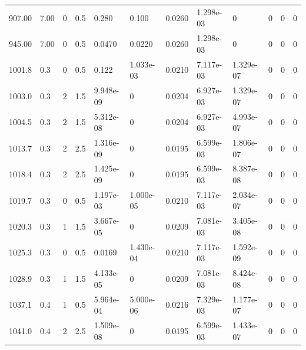 \documentclass[preview]{standalone}
\begin{document}
{{\begin{tabular}{L{1.2cm}C{1.2cm} C{0.3cm}C{0.5cm} C{1.4cm}C{1.4cm} C{1.4cm}C{1.4cm} C{1.6cm}C{1.6cm} C{1.6cm}C{1.6cm}}
  907.00  &  7.00  & 0     & 0.5 &  0.280  & 0.100  &  0.0260&   1.298e-03& 0 & 0   &  0 & 0  \\ 
  945.00  &  7.00  & 0     & 0.5 &  0.0470  & 0.0220  &  0.0260&   1.298e-03& 0 & 0   &  0 & 0  \\ 
  1001.8  &   0.3  & 0     & 0.5 &  0.122  & 1.033e-03  &  0.0210&   7.117e-03& 1.329e-07 & 0   &  0 & 0  \\ 
  1003.0  &   0.3  & 2     & 1.5 &  9.948e-09  & 0  &  0.0204&   6.927e-03& 1.329e-07 & 0   &  0 & 0  \\ 
  1004.5  &   0.3  & 2     & 1.5 &  5.312e-08  & 0  &  0.0204&   6.927e-03& 4.993e-07 & 0   &  0 & 0  \\ 
  1013.7  &   0.3  & 2     & 2.5 &  1.316e-09  & 0  &  0.0195&   6.599e-03& 1.806e-07 & 0   &  0 & 0  \\ 
  1018.4  &   0.3  & 2     & 2.5 &  1.425e-09  & 0  &  0.0195&   6.599e-03& 8.387e-08 & 0   &  0 & 0  \\ 
  1019.7  &   0.3  & 0     & 0.5 &  1.197e-03  & 1.000e-05  &  0.0210&   7.117e-03& 2.034e-07 & 0   &  0 & 0  \\ 
  1020.3  &   0.3  & 1     & 1.5 &  3.667e-05  & 0  &  0.0209&   7.081e-03& 3.405e-08 & 0   &  0 & 0  \\ 
  1025.3  &   0.3  & 0     & 0.5 &  0.0169  & 1.430e-04  &  0.0210&   7.117e-03& 1.592e-09 & 0   &  0 & 0  \\ 
  1028.9  &   0.3  & 1     & 1.5 &  4.133e-05  & 0  &  0.0209&   7.081e-03& 8.424e-08 & 0   &  0 & 0  \\ 
  1037.1  &   0.4  & 1     & 0.5 &  5.964e-04  & 5.000e-06  &  0.0216&   7.329e-03& 1.177e-07 & 0   &  0 & 0  \\ 
  1041.0  &   0.4  & 2     & 2.5 &  1.509e-08  & 0  &  0.0195&   6.599e-03& 1.433e-07 & 0   &  0 & 0  \\ 
\hline 
\end{tabular} 

}}
\end{document}
